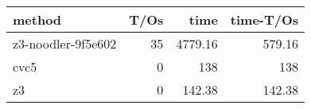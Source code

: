 \begin{tabular}{lrrr}
\hline
 method             &   T/Os &    time &   time-T/Os \\
\hline
 z3-noodler-9f5e602 &     35 & 4779.16 &      579.16 \\
 cvc5               &      0 &  138    &      138    \\
 z3                 &      0 &  142.38 &      142.38 \\
\hline
\end{tabular}
